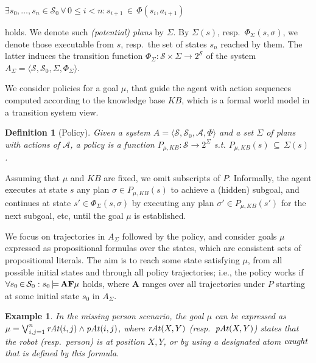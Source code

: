 \documentclass{new_tlp}
\newcommand{\sys}{\ensuremath{A}}
\def\mi#1{\mathit{#1\/}}
\def\ins{\,{\in}\,}
\newtheorem{defn}{Definition}
\newtheorem{exmp}{Example}
\begin{document}
\smallskip

\centerline{$\exists s_0,\dots,s_n \in \mathcal{S}_0\, \forall\, 0\leq i<n:
s_{i+1} \ins \Phi(s_i,a_{i+1})$}

\smallskip

\noindent holds. We denote such \emph{(potential) plans} by $\Sigma$. By
$\Sigma(s)$, resp.\ $\Phi_\Sigma(s,\sigma)$, we denote those 
executable from $s$, 
resp.\ the set of states $s_n$ reached by them. The latter
induces the transition function
$\Phi_\Sigma: \mathcal{S} \times \Sigma \rightarrow 2^\mathcal{S}$ of
the system
$\sys_\Sigma{=}\langle \mathcal{S},\mathcal{S}_0,\Sigma,\Phi_\Sigma\rangle$.

We consider policies for a 
goal $\mu$, %
that guide the agent with action sequences 
computed according to the knowledge base $KB$,
which is a formal world model in a transition system view. 

\begin{defn}[Policy]
Given a system $\sys=\langle \mathcal{S},\mathcal{S}_0,\mathcal{A},\Phi\rangle$ and a set $\Sigma$ of plans with actions of $\mathcal{A}$, a \emph{policy} is 
a function $P_{\mu, KB}:\mathcal{S} {\rightarrow} 2^{\Sigma}$
s.t. $P_{\mu, KB}(s) \,{\subseteq}\, \Sigma(s)$. 
\end{defn}
\noindent 
Assuming that $\mu$ and $KB$ are fixed, we omit subscripts of $P$.
Informally, the agent executes at state $s$ any plan $\sigma\in P_{\mu, KB}(s)$ to achieve a (hidden) subgoal, and continues at state $s'\in
\Phi_\Sigma(s,\sigma)$ by executing any plan $\sigma'\in P_{\mu,
KB}(s')$ for the next subgoal, etc, until the goal $\mu$ is established.


We focus on trajectories in
$\sys_\Sigma$
followed by the policy,
and consider goals $\mu$ expressed as propositional formulas 
over the states, which are consistent sets of propositional literals. The aim is to reach some state 
satisfying $\mu$, from all possible initial states and through all
policy trajectories;
i.e., 
the policy works if $\forall s_0\,{\in}\,\mathcal{S}_0 :
s_0\,{\models}\, {\bf AF}\mu$
holds,
where {\bf A} ranges over all trajectories under $P\!$ starting at some
initial state $s_0$ in $A_\Sigma$.

\begin{exmp}
In the missing person scenario, the goal $\mu$ can be expressed as
$\mu=\bigvee_{i,j=1}^n \mi{rAt}(i,j)\land \mi{pAt}(i,j)$, 
where $\mi{rAt}(X,Y)$ (resp.\ $\mi{pAt}(X,Y)$)  states that the 
robot (resp.\ person) is at position $X,Y$, 
or by using a designated atom $\mi{caught}$ that is defined by this formula.

\end{exmp}
\end{document}
